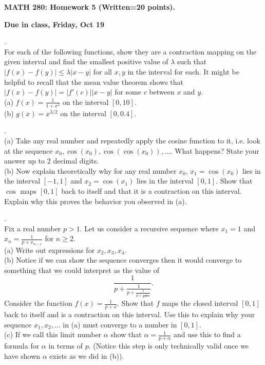 \documentclass[12 pt]{article}
\begin{document}
\centerline{\bf MATH 280: Homework 5 (Written=20 points). }
\centerline{\bf Due in class, Friday, Oct 19}

\bigskip

. \\
For each of the following functions, show they are a contraction mapping on the given interval and find the smallest positive value of 
$\lambda$ such that $|f(x)-f(y)| \leq \lambda |x-y|$ for all $x,y$ in the interval for each. It might be helpful to recall that the mean value theorem 
shows that $|f(x)-f(y)|=|f'(c)||x-y|$ for some $c$ between $x$ and $y$. \\
(a) $f(x)=\frac{1}{1+x^2}$ on the interval $[0,10]$. \\
(b) $g(x)=x^{3/2}$ on the interval $[0,0.4]$. \\

\medskip

. \\
(a) Take any real number and repeatedly apply the cosine function to it, i.e. look at the sequence $x_0, \cos(x_0), \cos(\cos(x_0)), \dots$. 
What happens? State your answer up to 2 decimal digits. \\
(b) Now explain theoretically why for any real number $x_0$, $x_1=\cos(x_0)$ lies in the interval $[-1,1]$ and $x_2=\cos(x_1)$ lies in the interval
$[0,1]$. Show that $\cos$ maps $[0,1]$ back to itself and that it is a contraction on this interval. Explain why this proves the behavior you observed 
in (a).

\medskip

. \\
Fix a real number $p > 1$. Let us consider a recursive sequence where $x_1=1$ and $x_n=\frac{1}{p+x_{n-1}}$ for $n \geq 2$. \\
(a) Write out expressions for $x_2, x_3, x_4$. \\
(b) Notice if we can show the sequence converges then it would converge to something that we could interpret as the value of 
$$
\frac{1}{p+\frac{1}{p+\frac{1}{p+\frac{1}{p+\dots}}}}.
$$
Consider the function $f(x)=\frac{1}{p+x}$. Show that $f$ maps the closed interval $[0,1]$ back to itself and is a contraction on this interval.
Use this to explain why your sequence $x_1,x_2,\dots$ in (a) must converge to a number in $[0,1]$. \\
(c) If we call this limit number $\alpha$ show that $\alpha = \frac{1}{p+\alpha}$ and use this to find a formula for $\alpha$ in terms of $p$. 
(Notice this step is only technically valid once we have shown $\alpha$ exists as we did in (b)).
\end{document}
